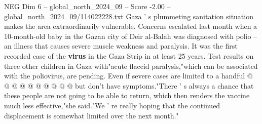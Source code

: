 \begin{textsample}{NEG Dim 6 – global\_north\_2024\_09 – Score -2.00 – global\_north\_2024\_09/114022228.txt}
Gaza ' s plummeting sanitation situation makes the area extraordinarily vulnerable.
Concerns escalated last month when a 10-month-old baby in the Gazan city of Deir al-Balah was diagnosed with polio -- an illness that causes severe muscle weakness and paralysis.
It was the first recorded case of the \textbf{virus} in the Gaza Strip in at least 25 years.
Test results on three other children in Gaza with"acute flaccid paralysis,"which can be associated with the poliovirus, are pending.
Even if severe cases are limited to a handful @ @ @ @ @ @ @ @ @ @ but don't have symptoms."There ' s always a chance that these people are not going to be able to return, which then renders the vaccine much less effective,"she said."We ' re really hoping that the continued displacement is somewhat limited over the next month."

\end{textsample}
